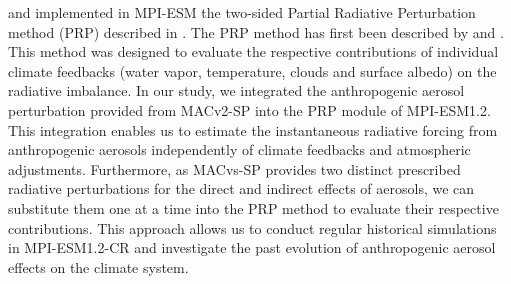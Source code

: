 \documentclass[draft]{agujournal2019}
\begin{document}
       and  implemented in MPI-ESM the two-sided Partial Radiative Perturbation method (PRP) described in . The PRP method has first been described by  and . This method was designed to evaluate the respective contributions of individual climate feedbacks (water vapor, temperature, clouds and surface albedo) on the radiative imbalance. In our study, we integrated the anthropogenic aerosol perturbation provided from MACv2-SP into the PRP module of MPI-ESM1.2. This integration enables us to estimate the instantaneous radiative forcing from anthropogenic aerosols independently of climate feedbacks and atmospheric adjustments. Furthermore, as MACvs-SP provides two distinct prescribed radiative perturbations for the direct and indirect effects of aerosols, we can substitute them one at a time into the PRP method to evaluate their respective contributions. This approach allows us to conduct regular historical simulations in MPI-ESM1.2-CR and investigate the past evolution of anthropogenic aerosol effects on the climate system.

\end{document}
